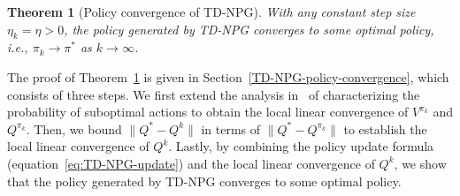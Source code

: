 \documentclass[10pt]{article}
\theoremstyle{plain}
\newtheorem{theorem}{Theorem}[section]
\theoremstyle{definition}
\begin{document}
\begin{theorem}[Policy convergence of TD-NPG]
    With any constant step size $\eta_k=\eta>0$, the policy generated by TD-NPG converges to some optimal policy, i.e., $\pi_k \to \pi^*$ as $k \to \infty$.
    \label{thm:policy-convergence-of-TD-NPG}
\end{theorem}


The proof of Theorem~\ref{thm:policy-convergence-of-TD-NPG} is given in Section~\ref{TD-NPG-policy-convergence}, which consists of three steps.
We  first extend the analysis in~\cite{Khodadadian_Jhunjhunwala_Varma_Maguluri_2021,li2025phi} of characterizing the probability of suboptimal actions to obtain the local linear convergence of $V^{\pi_k}$ and $Q^{\pi_k}$. Then, we bound $\| Q^* - Q^k \|$ in terms of $\| Q^* - Q^{\pi_k} \|$ to establish the local linear convergence of $Q^k$. Lastly, by combining the policy update formula (equation~\eqref{eq:TD-NPG-update}) and the local linear convergence of $Q^k$, we show that the policy generated by TD-NPG converges to some optimal policy.


\end{document}
